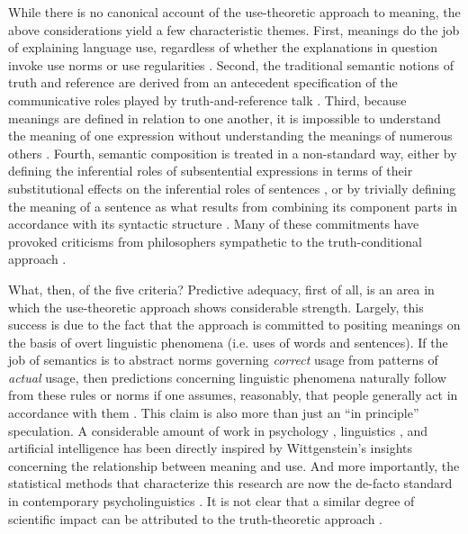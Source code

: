 While there is no canonical account of the use-theoretic approach to meaning, the above considerations yield a few characteristic themes. First, meanings do the job of explaining language use, regardless of whether the explanations in question invoke use norms \citep{Brandom:2000,Brandom:1994} or use regularities \citep{Horwich:2005,Horwich:1998}. Second, the traditional semantic notions of truth and reference are derived from an antecedent specification of the communicative roles played by truth-and-reference talk \citep{Horwich:1998,Horwich:2005,Brandom:2000,Brandom:1994}. Third, because meanings are defined in relation to one another, it is impossible to understand the meaning of one expression without understanding the meanings of numerous others \citep{Brandom:1994,Brandom:2000}. Fourth, semantic composition is treated in a non-standard way, either by defining the inferential roles of subsentential expressions in terms of their substitutional effects on the inferential roles of sentences \citep{Brandom:2000,Brandom:1994,Block:1986}, or by trivially defining the meaning of a sentence as what results from combining its component parts in accordance with its syntactic structure \citep{Horwich:2005}. Many of these commitments have provoked criticisms from philosophers sympathetic to the truth-conditional approach \citep{Stanley:2008,Speaks:2014}. 

What, then, of the five criteria? Predictive adequacy, first of all, is an area in which the use-theoretic approach shows considerable strength. Largely, this success is due to the fact that the approach is committed to positing meanings on the basis of overt linguistic phenomena (i.e. uses of words and sentences). If the job of semantics is to abstract norms governing \textit{correct} usage from patterns of \textit{actual} usage, then predictions concerning linguistic phenomena naturally follow from these rules or norms if one assumes, reasonably, that people generally act in accordance with them \cite[see][for disscussion of this ``rationality assumption'']{Dennett:1987,Brandom:1994}. This claim is also more than just an ``in principle'' speculation. A considerable amount of work in psychology \citep[e.g.,][]{FrankGoodman:2012}, linguistics \citep[e.g.,][]{Tomasello:2005,Manning:1999}, and artificial intelligence \citep[e.g.,][]{TurneyPantel:2010} has been directly inspired by Wittgenstein's insights concerning the relationship between meaning and use. And more importantly, the statistical methods that characterize this research are now the de-facto standard in contemporary psycholinguistics \citep{Seidenberg:1997,Christiansen:2015}. It is not clear that a similar degree of scientific impact can be attributed to the truth-theoretic approach \citep[cf.][]{Soames:2010}.

